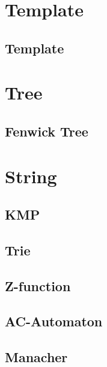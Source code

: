 \section{Template}
\subsection{Template}
\raggedbottom
\hrulefill
\section{Tree}
\subsection{Fenwick Tree}
\raggedbottom
\hrulefill
\section{String}
\subsection{KMP}
\raggedbottom
\subsection{Trie}
\raggedbottom
\subsection{Z-function}
\raggedbottom
\subsection{AC-Automaton}
\raggedbottom
\subsection{Manacher}
\raggedbottom
\hrulefill
\pagebreak
